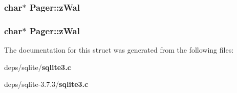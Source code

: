 \subsubsection{\setlength{\rightskip}{0pt plus 5cm}char$\ast$ \bf{Pager::z\-Wal}}\label{structPager_9f871bb53869eef36bfbe09d569ce835}


\subsubsection{\setlength{\rightskip}{0pt plus 5cm}char$\ast$ \bf{Pager::z\-Wal}}\label{structPager_9f871bb53869eef36bfbe09d569ce835}




The documentation for this struct was generated from the following files:\begin{CompactItemize}
\item 
deps/sqlite/\bf{sqlite3.c}\item 
deps/sqlite-3.7.3/\bf{sqlite3.c}\end{CompactItemize}

